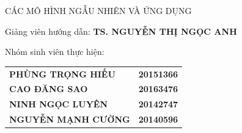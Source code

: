 \documentclass[12pt,a4paper,oneside]{book}
\newcommand{\projectname}{
	Học tăng cường\par
}
\newcommand{\teachername}{TS. Nguyễn Thị Ngọc Anh}
\begin{document}
\begin{titlepage}
\begin{center}
		\begin{LARGE}
			\MakeUppercase{Các mô hình ngẫu nhiên và ứng dụng}\par
		\end{LARGE}
		\vspace{1.5cm}
		\vspace{1cm}
		\begin{large}
			\begin{flushleft}
				\hspace{2cm}
				Giảng viên hướng dẫn: \MakeUppercase{\textbf{\teachername}}\par
				\vspace{0.5cm}
				\hspace{2cm}
				Nhóm sinh viên thực hiện:\par
				
				
				\begin{table}[H]
					\hspace{4.5cm}
					\begin{tabular}{ll}
					\textbf{PHÙNG TRỌNG HIẾU}  & \textbf{20151366} \\
					\textbf{CAO ĐĂNG SAO}      & \textbf{20163476} \\
					\textbf{NINH NGỌC LUYÊN}   & \textbf{20142747} \\
					\textbf{NGUYỄN MẠNH CƯỜNG} & \textbf{20140596}
					\end{tabular}
				\end{table}


\end{flushleft}
\end{large}
\end{center}
\end{titlepage}
\end{document}
